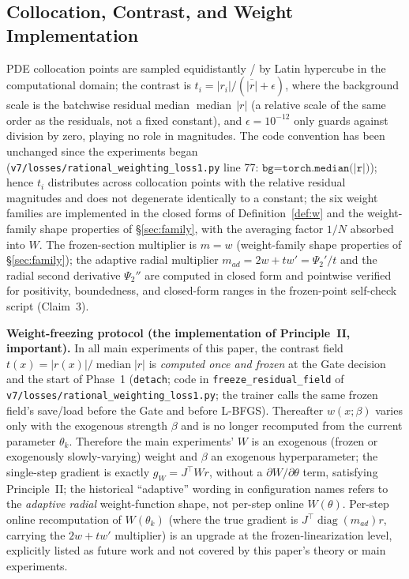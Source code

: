 \documentclass[11pt]{article}
\newcommand{\W}{W}
\DeclareMathOperator{\diag}{diag}
\numberwithin{equation}{section}
\begin{document}
\subsection{Collocation, Contrast, and Weight Implementation}
PDE collocation points are sampled equidistantly / by Latin hypercube in the computational domain; the contrast is $t_i=|r_i|/(\overline{|r|}+\epsilon)$, where the background scale is the batchwise residual median $\operatorname{median}\,|r|$ (a relative scale of the same order as the residuals, not a fixed constant), and $\epsilon=10^{-12}$ only guards against division by zero, playing no role in magnitudes. The code convention has been unchanged since the experiments began (\texttt{v7/\hspace{0pt}losses/\hspace{0pt}rational\_\hspace{0pt}weighting\_\hspace{0pt}loss1.py} line 77: $\texttt{bg=torch.median(|r|)}$); hence $t_i$ distributes across collocation points with the relative residual magnitudes and does not degenerate identically to a constant; the six weight families are implemented in the closed forms of Definition~\ref{def:w} and the weight-family shape properties of \S\ref{sec:family}, with the averaging factor $1/N$ absorbed into $\W$. The frozen-section multiplier is $m=w$ (weight-family shape properties of \S\ref{sec:family}); the adaptive radial multiplier $m_{ad}=2w+tw'=\Psi_2'/t$ and the radial second derivative $\Psi_2''$ are computed in closed form and pointwise verified for positivity, boundedness, and closed-form ranges in the frozen-point self-check script (Claim~3).
\par\smallskip\noindent\textbf{Weight-freezing protocol (the implementation of Principle~II, important).} In all main experiments of this paper, the contrast field $t(x)=|r(x)|/\operatorname{median}|r|$ is \emph{computed once and frozen} at the Gate decision and the start of Phase~1 (\texttt{detach}; code in \texttt{freeze\_\hspace{0pt}residual\_\hspace{0pt}field} of \texttt{v7/\hspace{0pt}losses/\hspace{0pt}rational\_\hspace{0pt}weighting\_\hspace{0pt}loss1.py}; the trainer calls the same frozen field's save/load before the Gate and before L-BFGS). Thereafter $w(x;\beta)$ varies only with the exogenous strength $\beta$ and is no longer recomputed from the current parameter $\theta_k$. Therefore the main experiments' $\W$ is an exogenous (frozen or exogenously slowly-varying) weight and $\beta$ an exogenous hyperparameter; the single-step gradient is exactly $g_\W=J^\top\W r$, without a $\partial\W/\partial\theta$ term, satisfying Principle~II; the historical ``adaptive'' wording in configuration names refers to the \emph{adaptive radial} weight-function shape, not per-step online $\W(\theta)$. Per-step online recomputation of $\W(\theta_k)$ (where the true gradient is $J^\top\diag(m_{ad})r$, carrying the $2w+tw'$ multiplier) is an upgrade at the frozen-linearization level, explicitly listed as future work and not covered by this paper's theory or main experiments.
\end{document}
